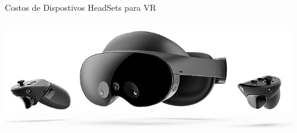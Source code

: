 \begin{frame}{Costos de Dispostivos HeadSets para VR}
\begin{columns}
\begin{column}{0.49\textwidth}
\begin{center}
\includegraphics[width=0.95\textwidth]{Figs/MetaPro.jpg}
\end{center}
\end{column}
\end{columns}
\end{frame}


